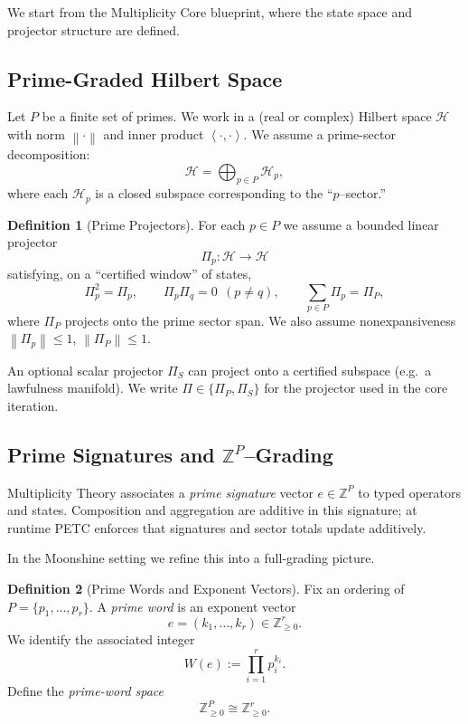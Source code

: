 \documentclass[11pt]{article}
\theoremstyle{definition}
\newtheorem{definition}{Definition}[section]
\theoremstyle{plain}
\theoremstyle{remark}
\newcommand{\Hcal}{\mathcal{H}}
\newcommand{\Zbb}{\mathbb{Z}}
\newcommand{\norm}[1]{\left\lVert #1 \right\rVert}
\newcommand{\ip}[2]{\left\langle #1, #2 \right\rangle}
\begin{document}
We start from the Multiplicity Core blueprint, where the state space and projector structure are defined.

\subsection{Prime-Graded Hilbert Space}

Let $P$ be a finite set of primes. We work in a (real or complex) Hilbert space $\Hcal$ with norm $\norm{\cdot}$ and inner product $\ip{\cdot}{\cdot}$.
We assume a prime-sector decomposition:
\begin{equation}
  \Hcal = \bigoplus_{p \in P} \Hcal_p,
\end{equation}
where each $\Hcal_p$ is a closed subspace corresponding to the ``$p$--sector.''

\begin{definition}[Prime Projectors]
For each $p \in P$ we assume a bounded linear projector
\[
  \Pi_p : \Hcal \to \Hcal
\]
satisfying, on a ``certified window'' of states,
\begin{equation}
  \Pi_p^2 = \Pi_p,\qquad
  \Pi_p \Pi_q = 0 \ \ (p \neq q),\qquad
  \sum_{p \in P} \Pi_p = \Pi_P,
\end{equation}
where $\Pi_P$ projects onto the prime sector span.
We also assume nonexpansiveness $\norm{\Pi_p} \le 1$, $\norm{\Pi_P} \le 1$.
\end{definition}

An optional scalar projector $\Pi_S$ can project onto a certified subspace (e.g.\ a lawfulness manifold).
We write $\Pi \in \{\Pi_P,\Pi_S\}$ for the projector used in the core iteration.

\subsection{Prime Signatures and $\Zbb^P$--Grading}

Multiplicity Theory associates a \emph{prime signature} vector $e \in \Zbb^P$ to typed operators and states.
Composition and aggregation are additive in this signature; at runtime PETC enforces that signatures and sector totals update additively.

In the Moonshine setting we refine this into a full-grading picture.

\begin{definition}[Prime Words and Exponent Vectors]
Fix an ordering of $P = \{p_1,\dotsc,p_r\}$.
A \emph{prime word} is an exponent vector
\[
  e = (k_1,\dotsc,k_r) \in \Zbb_{\ge 0}^r.
\]
We identify the associated integer
\[
  W(e) := \prod_{i=1}^r p_i^{k_i}.
\]
Define the \emph{prime-word space}
\[
  \Zbb_{\ge 0}^P \cong \Zbb_{\ge 0}^r.
\]
\end{definition}
\end{document}
